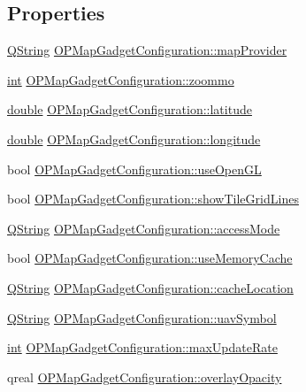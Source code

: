 \subsection*{Properties}
\begin{DoxyCompactItemize}
\item 
\hyperlink{group___u_a_v_objects_plugin_gab9d252f49c333c94a72f97ce3105a32d}{Q\-String} \hyperlink{group___o_p_map_plugin_ga6796d346f4d9edbe710a92a987f88659}{O\-P\-Map\-Gadget\-Configuration\-::map\-Provider}
\item 
\hyperlink{ioapi_8h_a787fa3cf048117ba7123753c1e74fcd6}{int} \hyperlink{group___o_p_map_plugin_gac07e4414a740f31223ffb1ce430ca3e8}{O\-P\-Map\-Gadget\-Configuration\-::zoommo}
\item 
\hyperlink{_super_l_u_support_8h_a8956b2b9f49bf918deed98379d159ca7}{double} \hyperlink{group___o_p_map_plugin_gaadef11a946190d55fa1bc45821414b77}{O\-P\-Map\-Gadget\-Configuration\-::latitude}
\item 
\hyperlink{_super_l_u_support_8h_a8956b2b9f49bf918deed98379d159ca7}{double} \hyperlink{group___o_p_map_plugin_ga7832a8e775f6e51898ad0075b150ccd5}{O\-P\-Map\-Gadget\-Configuration\-::longitude}
\item 
bool \hyperlink{group___o_p_map_plugin_gae922073575fb74cc0fa15b73223982ac}{O\-P\-Map\-Gadget\-Configuration\-::use\-Open\-G\-L}
\item 
bool \hyperlink{group___o_p_map_plugin_gaa46dc27228fb9c47c0c10f520d6099ab}{O\-P\-Map\-Gadget\-Configuration\-::show\-Tile\-Grid\-Lines}
\item 
\hyperlink{group___u_a_v_objects_plugin_gab9d252f49c333c94a72f97ce3105a32d}{Q\-String} \hyperlink{group___o_p_map_plugin_ga1b705326683a741d51646ad6c16a0687}{O\-P\-Map\-Gadget\-Configuration\-::access\-Mode}
\item 
bool \hyperlink{group___o_p_map_plugin_gae936e72883265ab40e9b30a0baaed122}{O\-P\-Map\-Gadget\-Configuration\-::use\-Memory\-Cache}
\item 
\hyperlink{group___u_a_v_objects_plugin_gab9d252f49c333c94a72f97ce3105a32d}{Q\-String} \hyperlink{group___o_p_map_plugin_ga182bffa488612f55a34e696590887dbf}{O\-P\-Map\-Gadget\-Configuration\-::cache\-Location}
\item 
\hyperlink{group___u_a_v_objects_plugin_gab9d252f49c333c94a72f97ce3105a32d}{Q\-String} \hyperlink{group___o_p_map_plugin_ga34e796aad89f226209a7325c28af859a}{O\-P\-Map\-Gadget\-Configuration\-::uav\-Symbol}
\item 
\hyperlink{ioapi_8h_a787fa3cf048117ba7123753c1e74fcd6}{int} \hyperlink{group___o_p_map_plugin_ga3ab3b510f0eb2b7cd3b183275eba0be1}{O\-P\-Map\-Gadget\-Configuration\-::max\-Update\-Rate}
\item 
qreal \hyperlink{group___o_p_map_plugin_gaf1bf43458d17cdb95a80a889c5508945}{O\-P\-Map\-Gadget\-Configuration\-::overlay\-Opacity}
\end{DoxyCompactItemize}


